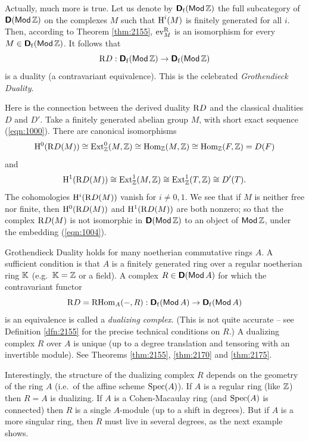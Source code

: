 Actually, much more is true. Let us denote by 
$\boldsymbol{\mathsf{D}}_{\mathrm{f}}(\operatorname{\mathsf{Mod}} \mathbb{Z})$
the full subcategory of $\boldsymbol{\mathsf{D}}(\operatorname{\mathsf{Mod}} \mathbb{Z})$ on the complexes $M$
such that $\operatorname{H}^i(M)$ is finitely generated for all $i$. Then, according to 
Theorem \ref{thm:2155}, $\operatorname{ev}^{\mathrm{R}}_M$ is an isomorphism for every 
$M \in \boldsymbol{\mathsf{D}}_{\mathrm{f}}(\operatorname{\mathsf{Mod}} \mathbb{Z})$. 
It follows that 
\begin{equation} \label{eqn:5004}
\mathrm{R} D : \boldsymbol{\mathsf{D}}_{\mathrm{f}}(\operatorname{\mathsf{Mod}} \mathbb{Z}) \to 
\boldsymbol{\mathsf{D}}_{\mathrm{f}}(\operatorname{\mathsf{Mod}} \mathbb{Z})
\end{equation}
is a duality (a contravariant equivalence). This is the celebrated {\em 
Grothendieck Duality}. 

Here is the connection between the derived duality $\mathrm{R} D$ and the 
classical dualities $D$ and $D'$. Take a finitely generated abelian group 
$M$, with short exact sequence (\ref{eqn:1000}). There are
canonical isomorphisms
\[ \mathrm{H}^0 (\mathrm{R} D(M)) \cong \operatorname{Ext}^0_{\mathbb{Z}}(M, \mathbb{Z}) \cong 
\operatorname{Hom}_{\mathbb{Z}}(M, \mathbb{Z}) \cong \operatorname{Hom}_{\mathbb{Z}}(F, \mathbb{Z}) = D(F)  \]
and 
\[ \mathrm{H}^1 (\mathrm{R} D(M)) \cong \operatorname{Ext}^1_{\mathbb{Z}}(M, \mathbb{Z}) 
\cong \operatorname{Ext}^1_{\mathbb{Z}}(T, \mathbb{Z}) \cong D'(T)  .  \]
The cohomologies $\mathrm{H}^i (\mathrm{R} D(M))$ vanish for $i \neq 0, 1$. 
We see that if $M$ is neither free nor finite, then  
$\mathrm{H}^0 (\mathrm{R} D(M))$ and $\mathrm{H}^1 (\mathrm{R} D(M))$ are both nonzero; 
so that the complex $\mathrm{R} D(M)$ is not isomorphic
in $\boldsymbol{\mathsf{D}}(\operatorname{\mathsf{Mod}} \mathbb{Z})$ to an object of 
$\operatorname{\mathsf{Mod}} \mathbb{Z}$, under the embedding (\ref{eqn:1004}). 

Grothendieck Duality holds for many noetherian commutative rings $A$. 
A sufficient condition is that $A$ is a finitely generated ring over a 
regular noetherian ring $\mathbb{K}$ (e.g.\ $\mathbb{K} = \mathbb{Z}$ or a field). 
A complex $R \in \boldsymbol{\mathsf{D}}(\operatorname{\mathsf{Mod}} A)$ for which the contravariant functor 
\begin{equation} \label{eqn:5010}
\mathrm{R} D = \operatorname{RHom}_{A}(-, R) : \boldsymbol{\mathsf{D}}_{\mathrm{f}}(\operatorname{\mathsf{Mod}} A) \to 
\boldsymbol{\mathsf{D}}_{\mathrm{f}}(\operatorname{\mathsf{Mod}} A)
\end{equation}
is an equivalence is called a  {\em dualizing complex}. 
(This is not quite accurate -- see Definition \ref{dfn:2155} for the precise 
technical conditions on $R$.) 
A dualizing complex $R$ over $A$ is unique (up to a degree translation and 
tensoring with an invertible module). 
See Theorems \ref{thm:2155}, \ref{thm:2170} and  \ref{thm:2175}. 

Interestingly, the structure of the dualizing complex $R$ depends on the
geometry of the ring $A$ (i.e.\ of the affine scheme $\operatorname{Spec}(A)$). 
If $A$ is a regular ring (like $\mathbb{Z}$) then $R = A$ is dualizing. 
If $A$ is a Cohen-Macaulay ring (and $\operatorname{Spec}(A)$ is connected) then $R$ is 
a single $A$-module (up to a shift in degrees). But if $A$ is a more 
singular ring, then $R$ must live in several degrees, as the next example 
shows. 

